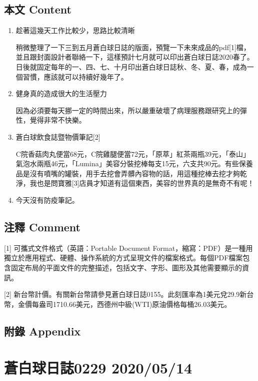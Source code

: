 \documentclass[a5paper, 12pt
]{book}
\begin{document}
\hypertarget{ux672cux6587-content-73}{%
\subsection{本文 Content}\label{ux672cux6587-content-73}}

\begin{enumerate}
\def\labelenumi{\arabic{enumi}.}
\item
  趁著這幾天工作比較少，思路比較清晰

  稍微整理了一下三到五月蒼白球日誌的版面，預覽一下未來成品的pdf{[}1{]}檔，並且跟封面設計者聯絡一下，這樣預計七月就可以印出蒼白球日誌2020春了。日後就固定每年的一、四、七、十月印出蒼白球日誌秋、冬、夏、春，成為一個習慣，應該就可以持續好幾年了。
\item
  健身真的造成很大的生活壓力

  因為必須要每天挪一定的時間出來，所以嚴重破壞了病理服務跟研究上的彈性，覺得非常不快樂。
\item
  蒼白球飲食誌暨物價筆記{[}2{]}

  C院香菇肉丸便當68元，C院雞腿便當72元，「原萃」紅茶兩瓶39元，「泰山」氣泡水兩瓶46元，「Lumina」美容分裝挖棒每支15元，六支共90元。有些保養品是沒有噴嘴的罐裝，用手去挖會弄髒內容物的話，用這種挖棒去挖才夠乾淨，我也是問寶雅{[}3{]}店員才知道有這個東西，美容的世界真的是無奇不有呢！
\item
  今天沒有防疫筆記。
\end{enumerate}

\hypertarget{ux6ce8ux91cb-comment-73}{%
\subsection{注釋 Comment}\label{ux6ce8ux91cb-comment-73}}

{[}1{]} 可攜式文件格式（英語：Portable Document
Format，縮寫：PDF）是一種用獨立於應用程式、硬體、操作系統的方式呈現文件的檔案格式。每個PDF檔案包含固定布局的平面文件的完整描述，包括文字、字形、圖形及其他需要顯示的資訊。

{[}2{]}
新台幣計價。有關新台幣請參見蒼白球日誌0155。此刻匯率為1美元兌29.9新台幣，金價每盎司1710.66美元，西德州中級(WTI)原油價格每桶26.03美元。

\hypertarget{ux9644ux9304-appendix-73}{%
\subsection{附錄 Appendix}\label{ux9644ux9304-appendix-73}}

\hypertarget{ux84bcux767dux7403ux65e5ux8a8c0229-20200514}{%
\section{蒼白球日誌0229
2020/05/14}\label{ux84bcux767dux7403ux65e5ux8a8c0229-20200514}}
\end{document}
